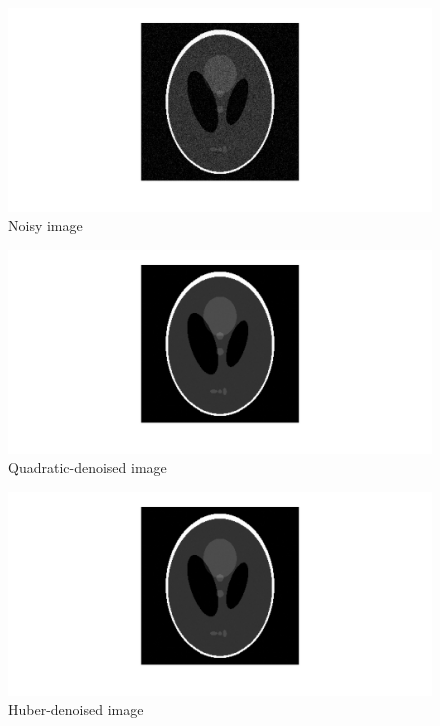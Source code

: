 \documentclass[11pt]{article}
\begin{document}
\begin{figure}[H]
\caption{Noisy image}
\begin{center}
\includegraphics[scale=0.5]{imageNoisy}
\end{center}
\end{figure}

\begin{figure}[H]
\caption{Quadratic-denoised image}
\begin{center}
\includegraphics[scale=0.5]{quadDenoised}
\end{center}
\end{figure}

\begin{figure}[H]
\caption{Huber-denoised image}
\begin{center}
\includegraphics[scale=0.5]{huberDenoised}
\end{center}
\end{figure}
\end{document}
